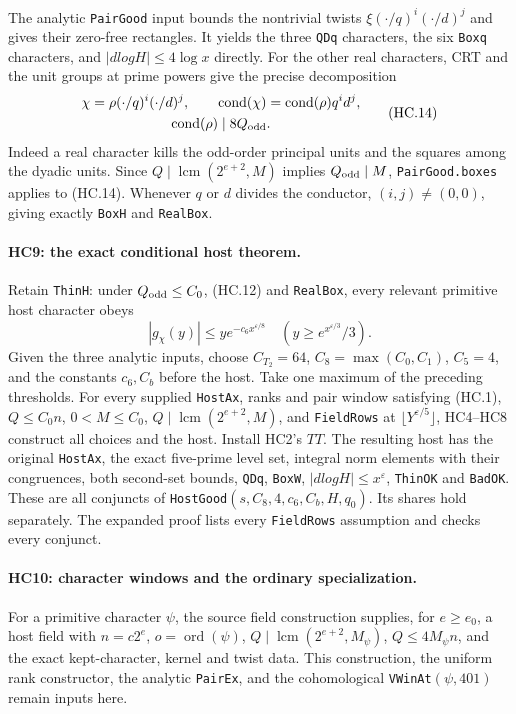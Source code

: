 The analytic \texttt{PairGood} input bounds the nontrivial twists
$\xi(\cdot/q)^i(\cdot/d)^j$ and gives their zero-free rectangles.
It yields the three \texttt{QDq} characters, the six
\texttt{Boxq} characters, and $|dlogH|\le4\log x$ directly.
For the other real characters, CRT and the unit groups at prime
powers give the precise decomposition
\[
 \begin{gathered}
 \chi=\rho(\cdot/q)^i(\cdot/d)^j,\qquad
 \operatorname{cond}(\chi)=\operatorname{cond}(\rho)q^id^j,\\
 \operatorname{cond}(\rho)\mid8Q_{\rm odd}.
 \end{gathered}                                      \tag{HC.14}
\]
Indeed a real character kills the odd-order principal units and
the squares among the dyadic units. Since
$Q\mid\operatorname{lcm}(2^{e+2},M)$ implies $Q_{\rm odd}\mid M$,
\texttt{PairGood.boxes} applies to (HC.14). Whenever $q$ or $d$
divides the conductor, $(i,j)\ne(0,0)$, giving exactly
\texttt{BoxH} and \texttt{RealBox}.

\paragraph{HC9: the exact conditional host theorem.}
Retain \texttt{ThinH}: under $Q_{\rm odd}\le C_0$, (HC.12) and
\texttt{RealBox}, every relevant primitive host character obeys
\[
 |g_\chi(y)|\le y e^{-c_6x^{\varepsilon/8}}
 \quad\left(y\ge e^{x^{\varepsilon/3}}/3\right).       \tag{HC.15}
\]
Given the three analytic inputs, choose
$C_{T_2}=64$, $C_8=\max(C_0,C_1)$, $C_5=4$, and the constants
$c_6,C_b$ before the host. Take one maximum of the preceding
thresholds. For every supplied \texttt{HostAx}, ranks and pair
window satisfying (HC.1), $Q\le C_0n$,
$0<M\le C_0$, $Q\mid\operatorname{lcm}(2^{e+2},M)$, and
\texttt{FieldRows} at $\lfloor Y^{\varepsilon/5}\rfloor$,
HC4--HC8 construct all choices and the host. Install HC2's $TT$.
The resulting host has the original \texttt{HostAx}, the exact
five-prime level set, integral norm elements with their congruences,
both second-set bounds, \texttt{QDq}, \texttt{BoxW},
$|dlogH|\le x^\varepsilon$, \texttt{ThinOK} and \texttt{BadOK}.
These are all conjuncts of
\texttt{HostGood}$(s,C_8,4,c_6,C_b,H,q_0)$.
Its shares hold separately. The expanded proof lists every
\texttt{FieldRows} assumption and checks every conjunct.

\paragraph{HC10: character windows and the ordinary specialization.}
For a primitive character $\psi$, the source field construction
supplies, for $e\ge e_0$, a host field with
$n=c2^e$, $o=\operatorname{ord}(\psi)$,
$Q\mid\operatorname{lcm}(2^{e+2},M_\psi)$,
$Q\le4M_\psi n$, and the exact kept-character, kernel and twist
data. This construction, the uniform rank constructor, the analytic
\texttt{PairEx}, and the cohomological \texttt{VWinAt}$(\psi,401)$
remain inputs here.

